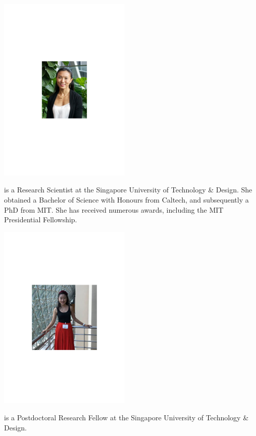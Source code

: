 \begin{center}
\includegraphics[clip=true, width=0.475\textwidth]{photo_sihui_tan}
\end{center}

 is a Research Scientist at the Singapore University of Technology \& Design. She obtained a Bachelor of Science with Honours from Caltech, and subsequently a PhD from MIT. She has received numerous awards, including the MIT Presidential Fellowship.


%
%

\begin{center}
\includegraphics[clip=true, width=0.475\textwidth]{photo_nana_liu}
\end{center}

 is a Postdoctoral Research Fellow at the Singapore University of Technology \& Design.

